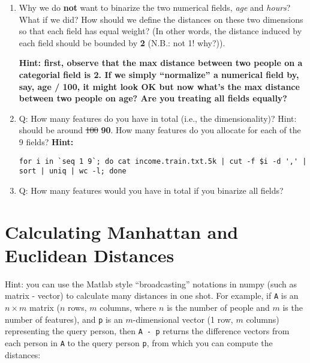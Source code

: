 \documentclass[11pt]{article}
\newcommand{\update}[1]{{\bf\color{black} #1}}
\begin{document}
\begin{enumerate}
\item
  Why we do {\bf not} want to binarize the two numerical fields, {\it age} and {\it hours}?
  What if we did?
  How should we define the distances on these two dimensions so that
  each field has equal weight? (In other words, the distance induced by
  each field should be bounded by \update{2} (N.B.: not 1! why?)).
  
  \update{Hint: first, observe that the max distance between two people on a categorial field is 2. If we simply ``normalize'' a numerical field by, say, age / 100, it might look OK but now what's the max distance between two people on age? Are you treating all fields equally?}
  
  



\item 
  Q: How many features do you have in total (i.e., the dimensionality)?
  Hint: should be around \sout{100} \update{90}.
  How many features do you allocate for 
  each of the 9 fields?
\update{  Hint:   }
 \color{black}
\begin{verbatim}
for i in `seq 1 9`; do cat income.train.txt.5k | cut -f $i -d ',' | sort | uniq | wc -l; done
\end{verbatim}
\color{black}

\item
  Q: How many features would you have in total if you binarize all fields?

\end{enumerate}


\section{Calculating Manhattan and Euclidean Distances}

Hint: you can use the Matlab style ``broadcasting'' notations in numpy (such as matrix - vector) 
to calculate many distances in one shot.  
For example, if \verb|A| is an $n \times m$ matrix ($n$ rows, $m$ columns, where $n$ is the number of people and $m$ is the number of features), and \verb|p| is an $m$-dimensional vector (1 row, $m$ columns) representing the query person, then \verb|A - p| returns the difference vectors from each person in \verb|A| to the query person \verb|p|, from which you can compute the distances:
\end{document}
